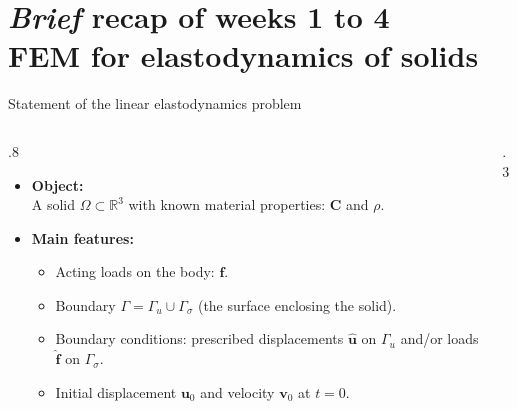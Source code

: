 \documentclass[aspectratio=169]{beamer}
\begin{document}
\section{\emph{Brief} recap of weeks 1 to 4 \\ FEM for elastodynamics of solids}
 {

  \begin{frame}{Statement of the linear elastodynamics problem}
    \begin{columns}[T]
      \begin{column}{.8\textwidth}
        \begin{itemize}
          \item \textbf{Object:} \\ A solid $\Omega\subset\mathbb R^{3}$ with known material properties: $\mathbf C$ and $\rho$.
                \vspace{0.3cm}
          \item \textbf{Main features:}
                \begin{itemize}
                  \item Acting loads on the body: $\mathbf f$.
                        \vspace{0.1cm}
                  \item Boundary $\Gamma=\Gamma_{u}\cup\Gamma_{\sigma}$ (the surface enclosing the solid).
                        \vspace{0.1cm}
                  \item Boundary conditions: prescribed displacements $\mathbf{\hat u}$ on $\Gamma_{u}$ and/or loads $\mathbf{\hat f}$ on $\Gamma_{\sigma}$.
                        \vspace{0.1cm}
                  \item Initial displacement $\mathbf u_0$ and velocity $\mathbf v_0$ at $t=0$.
                \end{itemize}
        \end{itemize}
      \end{column}
      \begin{column}{.3\textwidth}
        \begin{center}
\end{center}
\end{column}
\end{columns}
\end{frame}}
\end{document}

